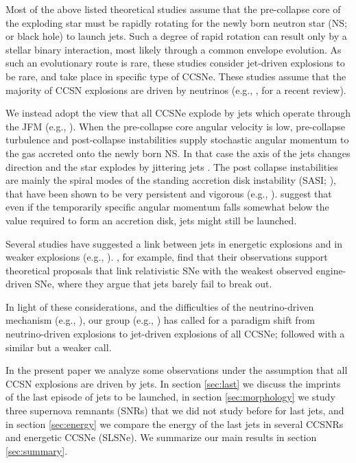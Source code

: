 \documentclass[12pt,preprint,a4paper]{aastex}
\begin{document}
Most of the above listed theoretical studies assume that the pre-collapse core of the exploding star must be rapidly rotating for the newly born neutron star (NS; or black hole) to launch jets. 
Such a degree of rapid rotation can result only by a stellar binary interaction, most likely through a common envelope evolution. As such an evolutionary route is rare, these studies consider jet-driven explosions to be rare, and take place in specific type of CCSNe. These studies assume that the majority of CCSN explosions are driven by neutrinos (e.g., \citealt{Mulller2016}, for a recent review).  

We instead adopt the view that all CCSNe explode by jets which operate through the JFM (e.g., \citealt{Gilkisetal2016}). When the pre-collapse core angular velocity is low, pre-collapse turbulence \citep{GilkisSoker2016} and post-collapse instabilities \citep{Papishetal2015a} supply stochastic angular momentum to the gas accreted onto the newly born NS.
In that case the axis of the jets changes direction and the star explodes by jittering jets \citep{Soker2016Rev}.  
The post collapse instabilities are mainly the spiral modes of the standing accretion disk instability (SASI; \citealt{Papishetal2015a}), that have been shown to be very persistent and vigorous (e.g., \citealt{ Jankaetal2016, MorenoMendezCantiello2016, Blondinetal2017, Kazeronietal2017}). \cite{SchreierSoker2016} suggest that even if the temporarily specific angular momentum falls somewhat below the value required to form an accretion disk, jets might still be launched. 

Several studies have suggested a link between jets in energetic explosions and in weaker explosions (e.g., \citealt{Sobacchietal2017}). 
\cite{Marguttietal2014}, for example, find that their observations support theoretical proposals that link relativistic SNe with the weakest observed engine-driven SNe, where they argue that jets barely fail to break out. 

In light of these considerations, and the difficulties of the neutrino-driven mechanism (e.g., \citealt{Kushnir2015, Papishetal2015b, Janka2017}), our group (e.g., \citealt{Papishetal2015b, Soker2017a}) has called for a paradigm shift from neutrino-driven explosions to jet-driven explosions of all CCSNe; \cite{Piranetal2017} followed with a similar but a weaker call. 

In the present paper we analyze some observations under the assumption that all CCSN explosions are driven by jets. In section \ref{sec:last} we discuss the imprints of the last episode of jets to be launched, in section \ref{sec:morphology} we study three supernova remnants (SNRs) that we did not study before for last jets, and in section \ref{sec:energy} we compare the energy of the last jets in several CCSNRs and energetic CCSNe (SLSNe). 
We summarize our main results in section \ref{sec:summary}. 
\end{document}
